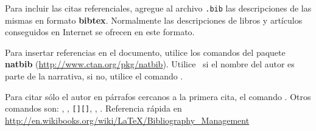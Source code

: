 
Para incluir las citas referenciales, agregue al archivo \texttt{.bib} las descripciones de las mismas en formato \textbf{bibtex}. Normalmente las descripciones de libros y artículos conseguidos en Internet se ofrecen en este formato.

Para insertar referencias en el documento, utilice los comandos del paquete \textbf{natbib} (\url{http://www.ctan.org/pkg/natbib}). Utilice \pa\ si el nombre del autor es parte de la narrativa, si no, utilice el comando \pa.

Para citar sólo el autor en párrafos cercanos a la primera cita, el comando \pa. Otros comandos son: , , \texttt{[][]}, , . Referencia rápida en \url{http://en.wikibooks.org/wiki/LaTeX/Bibliography_Management}



